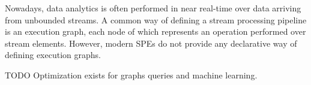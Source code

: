 Nowadays, data analytics is often performed in near real-time over data arriving from unbounded streams.
A common way of defining a stream processing pipeline is an execution graph, each node of which represents an operation performed over stream elements.
However, modern SPEs do not provide any declarative way of defining execution graphs.

TODO Optimization exists for graphs queries and machine learning.

